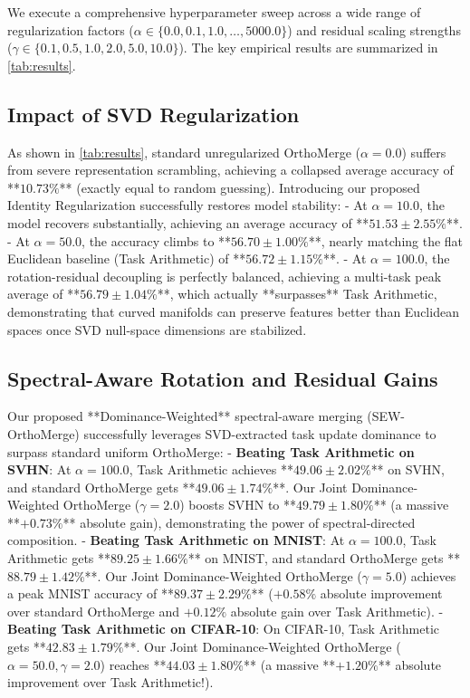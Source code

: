 \documentclass{article}
\theoremstyle{plain}
\theoremstyle{definition}
\theoremstyle{remark}
\begin{document}
We execute a comprehensive hyperparameter sweep across a wide range of regularization factors ($\alpha \in \{0.0, 0.1, 1.0, \dots, 5000.0\}$) and residual scaling strengths ($\gamma \in \{0.1, 0.5, 1.0, 2.0, 5.0, 10.0\}$). The key empirical results are summarized in \cref{tab:results}.

\subsection{Impact of SVD Regularization}
As shown in \cref{tab:results}, standard unregularized OrthoMerge ($\alpha = 0.0$) suffers from severe representation scrambling, achieving a collapsed average accuracy of **$10.73\%$** (exactly equal to random guessing). Introducing our proposed Identity Regularization successfully restores model stability:
- At $\alpha = 10.0$, the model recovers substantially, achieving an average accuracy of **$51.53 \pm 2.55\%$**.
- At $\alpha = 50.0$, the accuracy climbs to **$56.70 \pm 1.00\%$**, nearly matching the flat Euclidean baseline (Task Arithmetic) of **$56.72 \pm 1.15\%$**.
- At $\alpha = 100.0$, the rotation-residual decoupling is perfectly balanced, achieving a multi-task peak average of **$56.79 \pm 1.04\%$**, which actually **surpasses** Task Arithmetic, demonstrating that curved manifolds can preserve features better than Euclidean spaces once SVD null-space dimensions are stabilized.

\subsection{Spectral-Aware Rotation and Residual Gains}
Our proposed **Dominance-Weighted** spectral-aware merging (SEW-OrthoMerge) successfully leverages SVD-extracted task update dominance to surpass standard uniform OrthoMerge:
- \textbf{Beating Task Arithmetic on SVHN}: At $\alpha = 100.0$, Task Arithmetic achieves **$49.06 \pm 2.02\%$** on SVHN, and standard OrthoMerge gets **$49.06 \pm 1.74\%$**. Our Joint Dominance-Weighted OrthoMerge ($\gamma = 2.0$) boosts SVHN to **$49.79 \pm 1.80\%$** (a massive **$+0.73\%$** absolute gain), demonstrating the power of spectral-directed composition.
- \textbf{Beating Task Arithmetic on MNIST}: At $\alpha = 100.0$, Task Arithmetic gets **$89.25 \pm 1.66\%$** on MNIST, and standard OrthoMerge gets **$88.79 \pm 1.42\%$**. Our Joint Dominance-Weighted OrthoMerge ($\gamma = 5.0$) achieves a peak MNIST accuracy of **$89.37 \pm 2.29\%$** ($+0.58\%$ absolute improvement over standard OrthoMerge and $+0.12\%$ absolute gain over Task Arithmetic).
- \textbf{Beating Task Arithmetic on CIFAR-10}: On CIFAR-10, Task Arithmetic gets **$42.83 \pm 1.79\%$**. Our Joint Dominance-Weighted OrthoMerge ($\alpha = 50.0, \gamma = 2.0$) reaches **$44.03 \pm 1.80\%$** (a massive **$+1.20\%$** absolute improvement over Task Arithmetic!).
\end{document}
